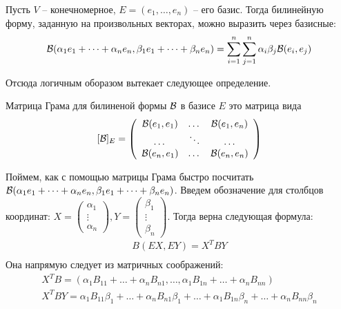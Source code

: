     \vspace*{5mm}
    
    Пусть $V$ -- конечномерное, $E = (e_1, \dots, e_n)$ -- его базис.
    Тогда билинейную форму, заданную на произвольных векторах, можно выразить через базисные: 
    \[ \mathcal{B}(\alpha_1 e_1 + \dots + \alpha_n e_n, \beta_1 e_1 + \dots + \beta_n e_n) = 
    \sum_{i=1}^{n} \sum_{j = 1}^{n} \alpha_i \beta_j \mathcal{B}(e_i, e_j) \]
    
    Отсюда логичным оборазом вытекает следующее определение.
    
    \begin{conj} Матрица Грама для билиненой формы $\mathcal{B}$ в базисе $E$ это матрица вида
    \[ [\mathcal{B}]_E = \left(\begin{array}{ccc}
    \mathcal{B}(e_1, e_1) & \dots & \mathcal{B}(e_1, e_n) \\ 
    \dots & \ddots & \dots \\ 
    \mathcal{B}(e_n, e_1) & \dots & \mathcal{B}(e_n, e_n)
    \end{array}\right) \] 
    \end{conj}
    
    \vspace*{5mm}
    
    Поймем, как с помощью матрицы Грама быстро посчитать $\mathcal{B}(\alpha_1 e_1 + \dots + \alpha_n e_n, \beta_1 e_1 + \dots + \beta_n e_n)$. 
    Введем обозначение для столбцов координат: $X = \begin{pmatrix}
        \alpha_1 \\
        \vdots \\
        \alpha_n
    \end{pmatrix}, Y = \begin{pmatrix}
        \beta_1 \\
        \vdots \\
        \beta_n
    \end{pmatrix}$. 
    Тогда верна следующая формула: \begin{gather*}
        B(EX, EY) = X^TBY \\
    \end{gather*}
    Она напрямую следует из матричных соображений: \begin{gather*}
        X^TB = (\alpha_1 B_{11} + \dots + \alpha_n B_{n1}, \dots, \alpha_1 B_{1n} + \dots + \alpha_n B_{nn}) \\
        X^TBY = \alpha_1 B_{11}\beta_1 + \dots + \alpha_n B_{n1}\beta_1 + \dots + \alpha_1 B_{1n}\beta_n + \dots + \alpha_n B_{nn}\beta_n 
    \end{gather*}
    
